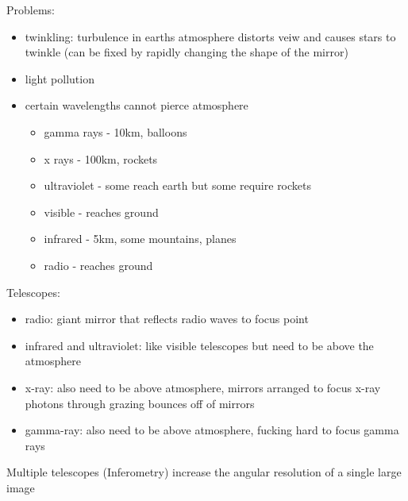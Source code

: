 \documentclass[12pt]{article}
\begin{document}
Problems:
\begin{itemize}
    \item twinkling: turbulence in earths atmosphere distorts veiw and causes stars to twinkle (can be fixed by rapidly changing the shape of the mirror)
    \item light pollution
    \item certain wavelengths cannot pierce atmosphere
    \begin{itemize}
        \item gamma rays - 10km, balloons
        \item x rays - 100km, rockets
        \item ultraviolet - some reach earth but some require rockets
        \item visible - reaches ground
        \item infrared - 5km, some mountains, planes
        \item radio - reaches ground
    \end{itemize}
\end{itemize}

Telescopes:
\begin{itemize}
    \item radio: giant mirror that reflects radio waves to focus point
    \item infrared and ultraviolet: like visible telescopes but need to be above the atmosphere
    \item x-ray: also need to be above atmosphere, mirrors arranged to focus x-ray photons through grazing bounces off of mirrors
    \item gamma-ray: also need to be above atmosphere, fucking hard to focus gamma rays
\end{itemize}

Multiple telescopes (Inferometry) increase the angular resolution of a single large image
\end{document}
